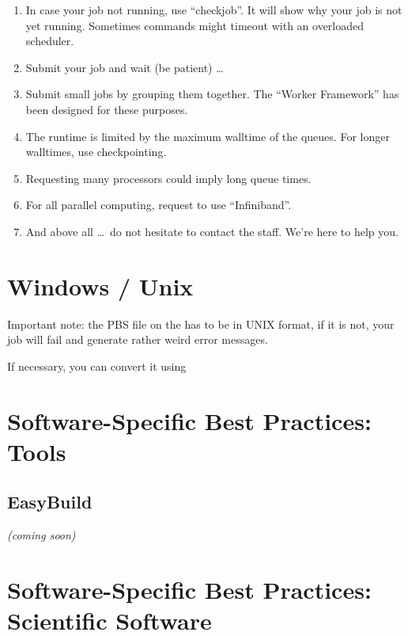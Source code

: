\begin{enumerate}
  \item  In case your job not running, use ``checkjob''.  It will show why your
    job is not yet running. Sometimes commands might timeout with an overloaded
    scheduler.

  \item  Submit your job and wait (be patient) \ldots

  \item  Submit small jobs by grouping them together. The ``Worker Framework''
    has been designed for these purposes.

  \item  The runtime is limited by the maximum walltime of the queues. For
    longer walltimes, use checkpointing.

  \item  Requesting many processors could imply long queue times.

  \item  For all parallel computing, request to use ``Infiniband''.

  \item  And above all \dots\ do not hesitate to contact the \hpc staff. We're
    here to help you.
\end{enumerate}

\section{Windows / Unix}

Important note: the PBS file on the \hpc has to be in UNIX format, if it is
not, your job will fail and generate rather weird error messages.

If necessary, you can convert it using
\begin{prompt}
\end{prompt}


\section{Software-Specific Best Practices: Tools}
\label{sec:software-specific-best-practices-tools}

\subsection{EasyBuild}
\label{sec:best-practices-easybuild}

\textit{(coming soon)}

\section{Software-Specific Best Practices: Scientific Software}
\label{sec:software-specific-best-practices-scientific-software}

